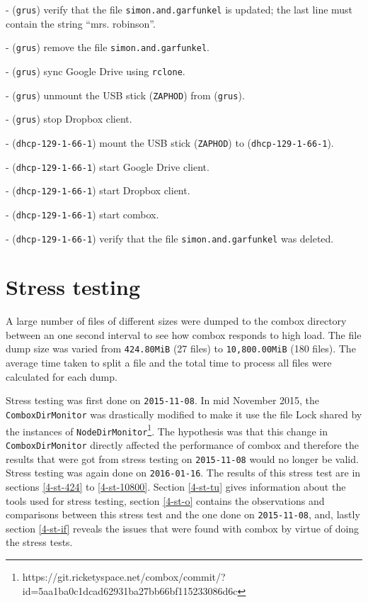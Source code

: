  - (\verb+grus+) verify that the file \verb+simon.and.garfunkel+ is
  updated; the last line must contain the string ``mrs. robinson''.

  - (\verb+grus+) remove the file \verb+simon.and.garfunkel+.

  - (\verb+grus+) sync Google Drive using \verb+rclone+.

  - (\verb+grus+) unmount the USB stick (\verb+ZAPHOD+) from
  (\verb+grus+).

  - (\verb+grus+) stop Dropbox client.

  - (\verb+dhcp-129-1-66-1+) mount the USB stick (\verb+ZAPHOD+) to
  (\verb+dhcp-129-1-66-1+).

  - (\verb+dhcp-129-1-66-1+) start Google Drive client.

  - (\verb+dhcp-129-1-66-1+) start Dropbox client.

  - (\verb+dhcp-129-1-66-1+) start combox.

  - (\verb+dhcp-129-1-66-1+) verify that the file
  \verb+simon.and.garfunkel+ was deleted.


\section{Stress testing}

A large number of files of different sizes were dumped to the combox
directory between an one second interval to see how combox responds to
high load. The file dump size was varied from \verb+424.80MiB+ (27
files) to \verb+10,800.00MiB+ (180 files). The average time taken
to split a file and the total time to process all files were
calculated for each dump.

Stress testing was first done on \verb+2015-11-08+. In mid November
2015, the \\ \verb+ComboxDirMonitor+ was drastically modified to make it
use the file Lock shared by the instances of
\verb+NodeDirMonitor+\footnote{https://git.ricketyspace.net/combox/commit/?id=5aa1ba0c1dcad62931ba27bb66bf115233086d6c}.
The hypothesis was that this change in \verb+ComboxDirMonitor+ directly
affected the performance of combox and therefore the results that were
got from stress testing on \verb+2015-11-08+ would no longer be
valid. Stress testing was again done on \verb+2016-01-16+. The results
of this stress test are in sections \ref{4-st-424} to
\ref{4-st-10800}. Section \ref{4-st-tu} gives information about the
tools used for stress testing, section \ref{4-st-o} contains the
observations and comparisons between this stress test and the one done
on \verb+2015-11-08+, and, lastly section \ref{4-st-if} reveals the issues
that were found with combox by virtue of doing the stress tests.

